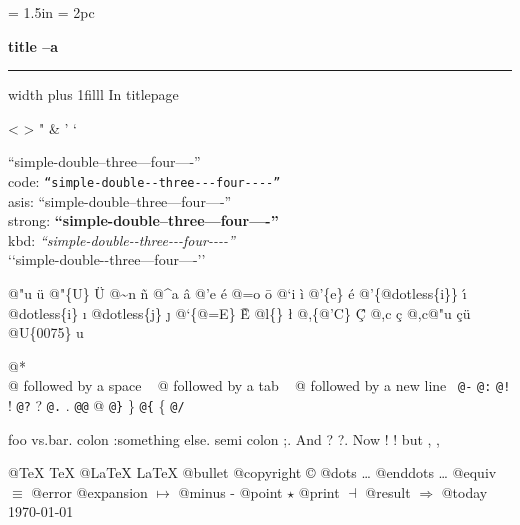 \documentclass{book}
\newcommand\GNUTexinfofrontmatter{\frontmatter}
\begin{document}
\GNUTexinfofrontmatter
\begin{titlepage}
\begingroup
\newskip\titlepagetopglue \titlepagetopglue = 1.5in
\newskip\titlepagebottomglue \titlepagebottomglue = 2pc
\setlength{\parindent}{0pt}
    \vglue\titlepagetopglue
{\raggedright {\huge \bfseries title --a}}
\vskip 4pt \hrule height 4pt width \hsize \vskip 4pt
\vskip 0pt plus 1filll
%
%
In titlepage

<
>
"
\&
'
`

``simple-double--three---four----''\leavevmode{}\\
code: \texttt{``simple-double{-}{-}three{-}{-}{-}four{-}{-}{-}-''} \leavevmode{}\\
asis: ``simple-double--three---four----'' \leavevmode{}\\
strong: \textbf{``simple-double--three---four----''} \leavevmode{}\\
kbd: {\ttfamily\textsl{``simple-double{-}{-}three{-}{-}{-}four{-}{-}{-}-''}} \leavevmode{}\\

`\hbox{}`simple-double-\hbox{}-three---four----'\hbox{}'\leavevmode{}\\

%
%
%
%

@"u \"{u} 
@"\{U\} \"{U} 
@\~{}n \~{n}
@\^{}a \^{a}
@'e \'{e}
@=o \={o}
@`i \`{i}
@'\{e\} \'{e}
@'\{@dotless\{i\}\} \'{\i{}} 
@dotless\{i\} \i{}
@dotless\{j\} \j{}
@`\{@=E\} \`{\={E}} 
@l\{\} \l{}
@,\{@'C\} \c{\'{C}}
@,c \c{c}
@,c@"u \c{c}\"{u} \leavevmode{}\\

@U\{0075\} u

@* \leavevmode{}\\
@ followed by a space
\ {}
@ followed by a tab
\ {}
@ followed by a new line
\ {}\texttt{@-} \-{}
\texttt{@:} \@
\texttt{@!} \@!
\texttt{@?} \@?
\texttt{@.} \@.
\texttt{@@} @
\texttt{@\}} \}
\texttt{@\{} \{
\texttt{@/} 

foo vs.\@ bar. 
colon :\@And something else.
semi colon ;\@.
And ? ?\@.
Now ! !\@@
but , ,\@

@TeX \TeX{}
@LaTeX \LaTeX{}
@bullet \textbullet{}
@copyright \copyright{}
@dots \dots{}\@
@enddots \dots{}
@equiv $\equiv{}$
@error 
@expansion $\mapsto{}$
@minus -
@point $\star{}$
@print $\dashv{}$
@result $\Rightarrow{}$
@today \today{}


\end{titlepage}
\end{document}
